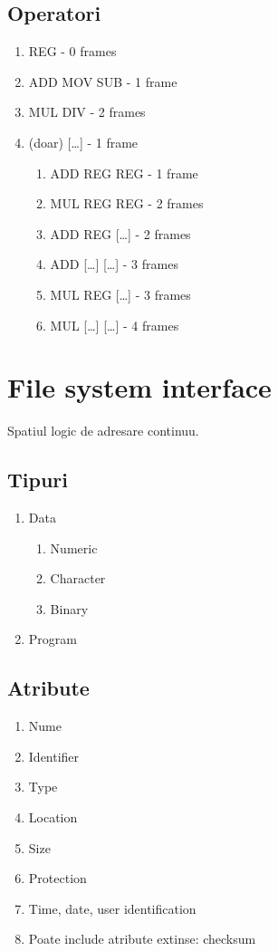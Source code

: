 \documentclass{article}
\begin{document}
\subsection*{Operatori}
\begin{enumerate}
    \item REG - 0 frames
    \item ADD MOV SUB - 1 frame
    \item MUL DIV - 2 frames
    \item (doar) [\dots] - 1 frame
          \begin{enumerate}
              \item ADD REG REG - 1 frame
              \item MUL REG REG - 2 frames
              \item ADD REG [\dots] - 2 frames
              \item ADD [\dots] [\dots] - 3 frames
              \item MUL REG [\dots] - 3 frames
              \item MUL [\dots] [\dots] - 4 frames
          \end{enumerate}
\end{enumerate}

\section[Ch13 File system interface]{File system interface}
Spatiul logic de adresare continuu.
\subsection*{Tipuri}
\begin{enumerate}
    \item Data
          \begin{enumerate}
              \item Numeric
              \item Character
              \item Binary
          \end{enumerate}
    \item Program
\end{enumerate}

\subsection*{Atribute}
\begin{enumerate}
    \item Nume
    \item Identifier
    \item Type
    \item Location
    \item Size
    \item Protection
    \item Time, date, user identification
    \item Poate include atribute extinse: checksum
\end{enumerate}
\end{document}
